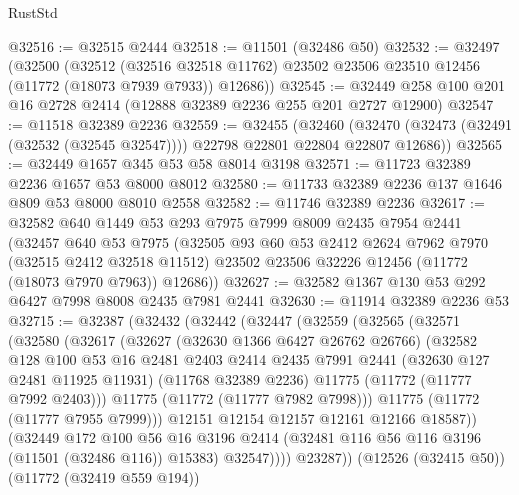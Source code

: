 \begin{lexlean}{RustStd}
\begin{coremodule}
@32516 := @32515 @2444
@32518 := @11501 (@32486 @50)
@32532 := @32497
    (@32500
      (@32512
        (@32516 @32518 @11762)
        @23502
        @23506
        @23510
        @12456
        (@11772 (@18073 @7939 @7933))
        @12686))
@32545 := @32449 @258 @100 @201 @16 @2728 @2414 (@12888 @32389 @2236 @255 @201 @2727 @12900)
@32547 := @11518 @32389 @2236
@32559 := @32455
    (@32460 (@32470 (@32473 (@32491 (@32532 (@32545 @32547)))) @22798 @22801 @22804 @22807 @12686))
@32565 := @32449 @1657 @345 @53 @58 @8014 @3198
@32571 := @11723 @32389 @2236 @1657 @53 @8000 @8012
@32580 := @11733 @32389 @2236 @137 @1646 @809 @53 @8000 @8010 @2558
@32582 := @11746 @32389 @2236
@32617 := @32582
    @640
    @1449
    @53
    @293
    @7975
    @7999
    @8009
    @2435
    @7954
    @2441
    (@32457
      @640
      @53
      @7975
      (@32505
        @93
        @60
        @53
        @2412
        @2624
        @7962
        @7970
        (@32515 @2412 @32518 @11512)
        @23502
        @23506
        @32226
        @12456
        (@11772 (@18073 @7970 @7963))
        @12686))
@32627 := @32582 @1367 @130 @53 @292 @6427 @7998 @8008 @2435 @7981 @2441
@32630 := @11914 @32389 @2236 @53
@32715 := @32387
    (@32432
      (@32442
        (@32447
          (@32559
            (@32565
              (@32571
                (@32580
                  (@32617
                    (@32627
                      (@32630 @1366 @6427 @26762 @26766)
                      (@32582
                        @128
                        @100
                        @53
                        @16
                        @2481
                        @2403
                        @2414
                        @2435
                        @7991
                        @2441
                        (@32630 @127 @2481 @11925 @11931)
                        (@11768 @32389 @2236)
                        @11775
                        (@11772 (@11777 @7992 @2403)))
                      @11775
                      (@11772 (@11777 @7982 @7998)))
                    @11775
                    (@11772 (@11777 @7955 @7999)))
                  @12151
                  @12154
                  @12157
                  @12161
                  @12166
                  @18587))
              (@32449
                @172
                @100
                @56
                @16
                @3196
                @2414
                (@32481 @116 @56 @116 @3196 (@11501 (@32486 @116)) @15383)
                @32547))))
        @23287))
    (@12526 (@32415 @50))
    (@11772 (@32419 @559 @194))

\end{coremodule}
\end{lexlean}
